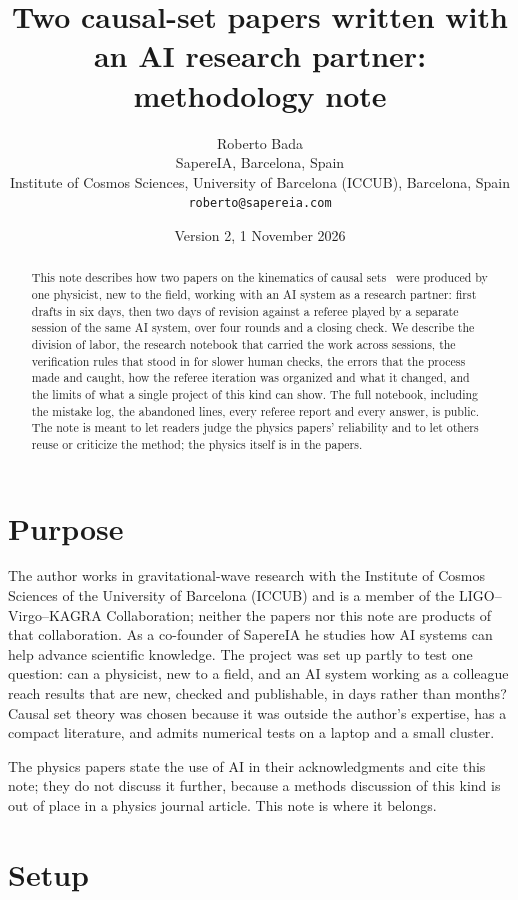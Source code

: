 \documentclass[11pt,a4paper]{article}
\title{Two causal-set papers written with an AI research partner:\\ methodology note}
\author{Roberto Bada\\ \small SapereIA, Barcelona, Spain\\ \small Institute of Cosmos Sciences, University of Barcelona (ICCUB), Barcelona, Spain\\ \small \texttt{roberto@sapereia.com}}
\date{Version 2, 1 November 2026}
\begin{document}
\maketitle

\begin{abstract}
This note describes how two papers on the kinematics of causal sets~\cite{Toolkit,Embedding} were produced by one physicist, new to the field, working with an AI system as a research partner: first drafts in six days, then two days of revision against a referee played by a separate session of the same AI system, over four rounds and a closing check. We describe the division of labor, the research notebook that carried the work across sessions, the verification rules that stood in for slower human checks, the errors that the process made and caught, how the referee iteration was organized and what it changed, and the limits of what a single project of this kind can show. The full notebook, including the mistake log, the abandoned lines, every referee report and every answer, is public. The note is meant to let readers judge the physics papers' reliability and to let others reuse or criticize the method; the physics itself is in the papers.
\end{abstract}

\section{Purpose}
The author works in gravitational-wave research with the Institute of Cosmos Sciences of the University of Barcelona (ICCUB) and is a member of the LIGO--Virgo--KAGRA Collaboration; neither the papers nor this note are products of that collaboration. As a co-founder of SapereIA he studies how AI systems can help advance scientific knowledge. The project was set up partly to test one question: can a physicist, new to a field, and an AI system working as a colleague reach results that are new, checked and publishable, in days rather than months? Causal set theory was chosen because it was outside the author's expertise, has a compact literature, and admits numerical tests on a laptop and a small cluster.

The physics papers state the use of AI in their acknowledgments and cite this note; they do not discuss it further, because a methods discussion of this kind is out of place in a physics journal article. This note is where it belongs.

\section{Setup}
\end{document}
